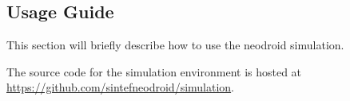 \subsection{Usage Guide}

This section will briefly describe how to use the neodroid simulation.

The source code for the simulation environment is hosted at \url{https://github.com/sintefneodroid/simulation}.
